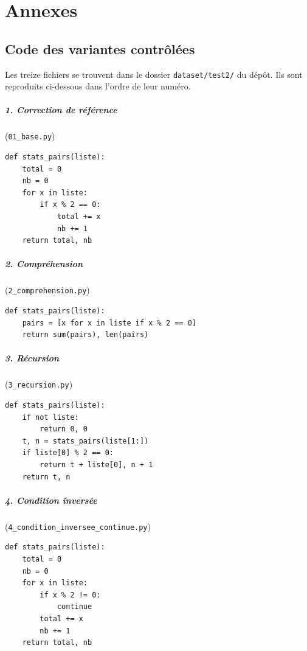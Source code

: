 \documentclass[12pt,a4paper,oneside]{report}
\begin{document}
\appendix
\chapter{Annexes}
\section{Code des variantes contrôlées}
\label{ann:variantes}

Les treize fichiers se trouvent dans le dossier \texttt{dataset/test2/} du
dépôt. Ils sont reproduits ci-dessous dans l'ordre de leur numéro.

\paragraph{1. Correction de référence} (\texttt{01\_base.py})
\begin{lstlisting}[style=pyncst]
def stats_pairs(liste):
    total = 0
    nb = 0
    for x in liste:
        if x % 2 == 0:
            total += x
            nb += 1
    return total, nb
\end{lstlisting}

\paragraph{2. Compréhension} (\texttt{2\_comprehension.py})
\begin{lstlisting}[style=pyncst]
def stats_pairs(liste):
    pairs = [x for x in liste if x % 2 == 0]
    return sum(pairs), len(pairs)
\end{lstlisting}

\paragraph{3. Récursion} (\texttt{3\_recursion.py})
\begin{lstlisting}[style=pyncst]
def stats_pairs(liste):
    if not liste:
        return 0, 0
    t, n = stats_pairs(liste[1:])
    if liste[0] % 2 == 0:
        return t + liste[0], n + 1
    return t, n
\end{lstlisting}

\paragraph{4. Condition inversée} (\texttt{4\_condition\_inversee\_continue.py})
\begin{lstlisting}[style=pyncst]
def stats_pairs(liste):
    total = 0
    nb = 0
    for x in liste:
        if x % 2 != 0:
            continue
        total += x
        nb += 1
    return total, nb
\end{lstlisting}
\end{document}
